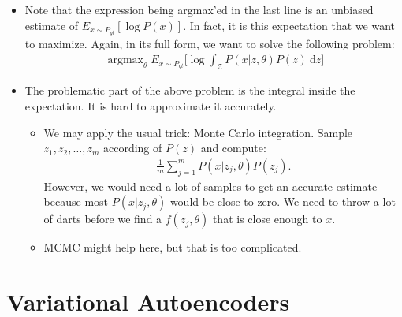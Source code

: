 \documentclass[10pt]{article}
\newcommand{\dee}{\mathrm{d}}
\DeclareMathOperator*{\argmax}{argmax}
\begin{document}
\begin{itemize}
  	\item Note that the expression being argmax'ed in the last line is an unbiased estimate of $E_{x \sim P_{gt}}[\log P(x)].$ In fact, it is this expectation that we want to maximize. Again, in its full form, we want to solve the following problem:
  	\begin{align*}
  	  \argmax_{\theta} E_{x \sim P_{gt}} \bigg[ \log \int_{\mathcal{Z}} P(x|z,\theta) P(z)\ \dee z \bigg]
  	\end{align*}

  	\item The problematic part of the above problem is the integral inside the expectation. It is hard to approximate it accurately.
  	\begin{itemize}
  	  \item We may apply the usual trick: Monte Carlo integration. Sample $z_1, z_2, \dotsc, z_m$ according of $P(z)$ and compute:
  	  \begin{align*}
  	  	\frac{1}{m} \sum_{j=1}^m P(x|z_j, \theta) P(z_j).
  	  \end{align*}
  	  However, we would need a lot of samples to get an accurate estimate because most $P(x|z_j, \theta)$ would be close to zero. We need to throw a lot of darts before we find a $f(z_j,\theta)$ that is close enough to $x$.

  	  \item MCMC might help here, but that is too complicated.
  	\end{itemize}
  \end{itemize}

  \section{Variational Autoencoders}
\end{document}
